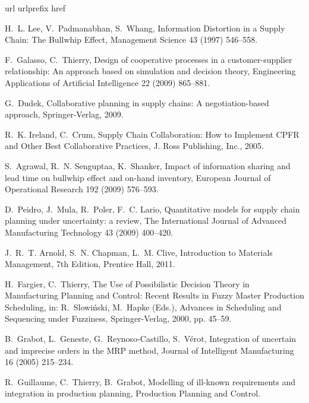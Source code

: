 \documentclass[11pt]{article}
\begin{document}
\begin{thebibliography}{10}
\expandafter\ifx\csname url\endcsname\relax
  \def\url#1{\texttt{#1}}\fi
\expandafter\ifx\csname urlprefix\endcsname\relax\def\urlprefix{URL }\fi
\expandafter\ifx\csname href\endcsname\relax
  \def\href#1#2{#2} \def\path#1{#1}\fi

H.~L. Lee, V.~Padmanabhan, S.~Whang, Information {D}istortion in a {S}upply
  {C}hain: {T}he {B}ullwhip {E}ffect, Management Science 43 (1997) 546--558.

F.~Galasso, C.~Thierry, Design of cooperative processes in a customer-supplier
  relationship: {A}n approach based on simulation and decision theory,
  Engineering Applications of Artificial Intelligence 22 (2009) 865--881.

G.~Dudek, Collaborative planning in supply chains: {A} negotiation-based
  approach, Springer-Verlag, 2009.

R.~K. Ireland, C.~Crum, Supply {C}hain {C}ollaboration: {H}ow to {I}mplement
  {CPFR} and {O}ther {B}est {C}ollaborative {P}ractices, J. Ross Publishing,
  Inc., 2005.

S.~Agrawal, R.~N. Senguptaa, K.~Shanker, Impact of information sharing and lead
  time on bullwhip effect and on-hand inventory, European Journal of
  Operational Research 192 (2009) 576--593.

D.~Peidro, J.~Mula, R.~Poler, F.~C. Lario, Quantitative models for supply chain
  planning under uncertainty: a review, The International Journal of Advanced
  Manufacturing Technology 43 (2009) 400--420.

J.~R.~T. Arnold, S.~N. Chapman, L.~M. Clive, {I}ntroduction to {M}aterials
  {M}anagement, 7th Edition, Prentice Hall, 2011.

H.~Fargier, C.~Thierry, The {U}se of {P}ossibilistic {D}ecision {T}heory in
  {M}anufacturing {P}lanning and {C}ontrol: {R}ecent {R}esults in {F}uzzy
  {M}aster {P}roduction {S}cheduling, in: R.~Slowi{\'n}ski, M.~Hapke (Eds.),
  {A}dvances in {S}cheduling and {S}equencing under {F}uzziness,
  Springer-Verlag, 2000, pp. 45--59.

B.~Grabot, L.~Geneste, G.~Reynoso-Castillo, S.~V{\'e}rot, Integration of
  uncertain and imprecise orders in the {MRP} method, Journal of Intelligent
  Manufacturing 16 (2005) 215--234.

R.~Guillaume, C.~Thierry, B.~Grabot, Modelling of ill-known requirements and
  integration in production planning, Production Planning and Control.


\end{thebibliography}
\end{document}

